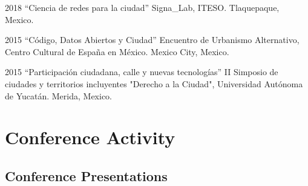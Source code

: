 \documentclass{academiccv}
\begin{document}
\begin{tablist}

\item[2018] \tab \enquote{Ciencia de redes para la ciudad} Signa\_Lab, ITESO. Tlaquepaque, Mexico.

\item[2015] \tab \enquote{Código, Datos Abiertos y Ciudad} Encuentro de Urbanismo Alternativo, Centro Cultural de España en México. Mexico City, Mexico.

\item[2015] \tab \enquote{Participación ciudadana, calle y nuevas tecnologías} II Simposio de ciudades y territorios incluyentes "Derecho a la Ciudad", Universidad Autónoma de Yucatán. Merida, Mexico.


\end{tablist}



\section*{Conference Activity}


	
	


	


\subsection*{Conference Presentations}
\end{document}
